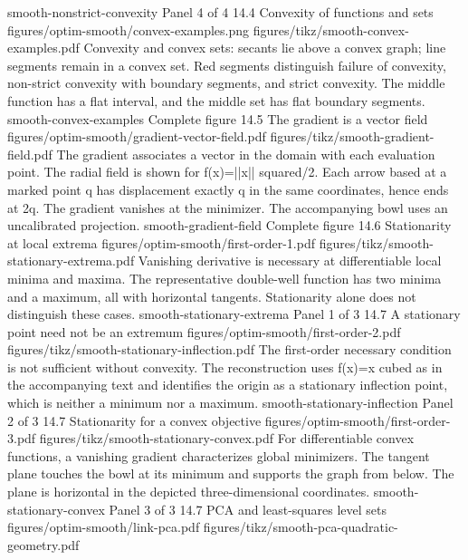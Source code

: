 {smooth-nonstrict-convexity}
{Panel 4 of 4}
{14.4}
{Convexity of functions and sets}
{figures/optim-smooth/convex-examples.png}
{figures/tikz/smooth-convex-examples.pdf}
{Convexity and convex sets: secants lie above a convex graph; line segments remain in a convex set.}
{Red segments distinguish failure of convexity, non-strict convexity with boundary segments, and strict convexity. The middle function has a flat interval, and the middle set has flat boundary segments.}
{smooth-convex-examples}
{Complete figure}
{14.5}
{The gradient is a vector field}
{figures/optim-smooth/gradient-vector-field.pdf}
{figures/tikz/smooth-gradient-field.pdf}
{The gradient associates a vector in the domain with each evaluation point.}
{The radial field is shown for f(x)=||x|| squared/2. Each arrow based at a marked point q has displacement exactly q in the same coordinates, hence ends at 2q. The gradient vanishes at the minimizer. The accompanying bowl uses an uncalibrated projection.}
{smooth-gradient-field}
{Complete figure}
{14.6}
{Stationarity at local extrema}
{figures/optim-smooth/first-order-1.pdf}
{figures/tikz/smooth-stationary-extrema.pdf}
{Vanishing derivative is necessary at differentiable local minima and maxima.}
{The representative double-well function has two minima and a maximum, all with horizontal tangents. Stationarity alone does not distinguish these cases.}
{smooth-stationary-extrema}
{Panel 1 of 3}
{14.7}
{A stationary point need not be an extremum}
{figures/optim-smooth/first-order-2.pdf}
{figures/tikz/smooth-stationary-inflection.pdf}
{The first-order necessary condition is not sufficient without convexity.}
{The reconstruction uses f(x)=x cubed as in the accompanying text and identifies the origin as a stationary inflection point, which is neither a minimum nor a maximum.}
{smooth-stationary-inflection}
{Panel 2 of 3}
{14.7}
{Stationarity for a convex objective}
{figures/optim-smooth/first-order-3.pdf}
{figures/tikz/smooth-stationary-convex.pdf}
{For differentiable convex functions, a vanishing gradient characterizes global minimizers.}
{The tangent plane touches the bowl at its minimum and supports the graph from below. The plane is horizontal in the depicted three-dimensional coordinates.}
{smooth-stationary-convex}
{Panel 3 of 3}
{14.7}
{PCA and least-squares level sets}
{figures/optim-smooth/link-pca.pdf}
{figures/tikz/smooth-pca-quadratic-geometry.pdf}
